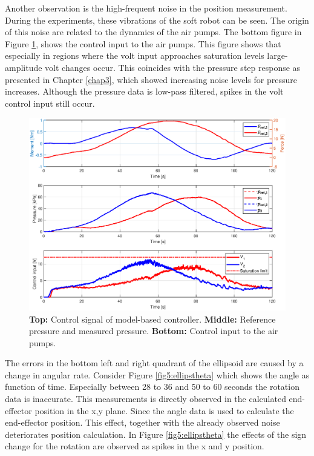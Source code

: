 Another observation is the high-frequent noise in the position measurement. During the experiments, these vibrations of the soft robot can be seen. The origin of this noise are related to the dynamics of the air pumps. The bottom figure in Figure \ref{fig5:controlellips}, shows the control input to the air pumps. This figure shows that especially in regions where the volt input approaches saturation levels large-amplitude volt changes occur. This coincides with the pressure step response as presented in Chapter \ref{chap3}, which showed increasing noise levels for pressure increases. Although the pressure data is low-pass filtered, spikes in the volt control input still occur. 


\begin{figure}[H]
    \centering
    \includegraphics[width = \textwidth]{Figures/Chapter5/input.eps}
    \caption{\textbf{Top:} Control signal of model-based controller. \textbf{Middle:} Reference pressure and measured pressure. \textbf{Bottom:} Control input to the air pumps.}
    \label{fig5:controlellips}
\end{figure}

The errors in the bottom left and right quadrant of the ellipsoid are caused by a change in angular rate. Consider Figure \ref{fig5:ellipstheta} which shows the angle as function of time. Especially between 28 to 36 and 50 to 60 seconds the rotation data is inaccurate. This measurements is directly observed in the calculated end-effector position in the x,y plane. Since the angle data is used to calculate the end-effector position. This effect, together with the already observed noise deteriorates position calculation. In Figure \ref{fig5:ellipstheta} the effects of the sign change for the rotation are observed as spikes in the x and y position.


